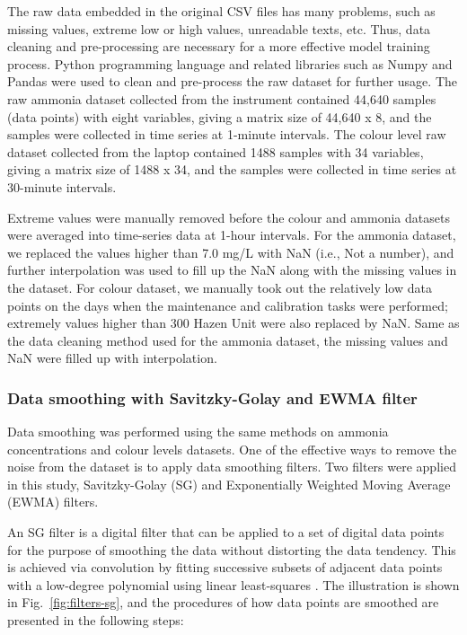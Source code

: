 The raw data embedded in the original CSV files has many problems, such as missing values, extreme low or high values, unreadable texts, etc. Thus, data cleaning and pre-processing are necessary for a more effective model training process. Python programming language and related libraries such as Numpy and Pandas were used to clean and pre-process the raw dataset for further usage. The raw ammonia dataset collected from the instrument contained 44,640 samples (data points) with eight variables, giving a matrix size of 44,640 x 8, and the samples were collected in time series at 1-minute intervals. The colour level raw dataset collected from the laptop contained 1488 samples with 34 variables, giving a matrix size of 1488 x 34, and the samples were collected in time series at 30-minute intervals.

Extreme values were manually removed before the colour and ammonia datasets were averaged into time-series data at 1-hour intervals. For the ammonia dataset, we replaced the values higher than 7.0 mg/L with NaN (i.e., Not a number), and further interpolation was used to fill up the NaN along with the missing values in the dataset. For colour dataset, we manually took out the relatively low data points on the days when the maintenance and calibration tasks were performed; extremely values higher than 300 Hazen Unit were also replaced by NaN. Same as the data cleaning method used for the ammonia dataset, the missing values and NaN were filled up with interpolation.

\subsubsection{Data smoothing with Savitzky-Golay and EWMA filter}
Data smoothing was performed using the same methods on ammonia concentrations and colour levels datasets. One of the effective ways to remove the noise from the dataset is to apply data smoothing filters. Two filters were applied in this study, Savitzky-Golay (SG) and Exponentially Weighted Moving Average (EWMA) filters.

An SG filter is a digital filter that can be applied to a set of digital data points for the purpose of smoothing the data without distorting the data tendency. This is achieved via convolution by fitting successive subsets of adjacent data points with a low-degree polynomial using linear least-squares \citep{wikipediaSavitzkyGolayFilter2022}. The illustration is shown in Fig.~\ref{fig:filters-sg}, and the procedures of how data points are smoothed are presented in the following steps:

